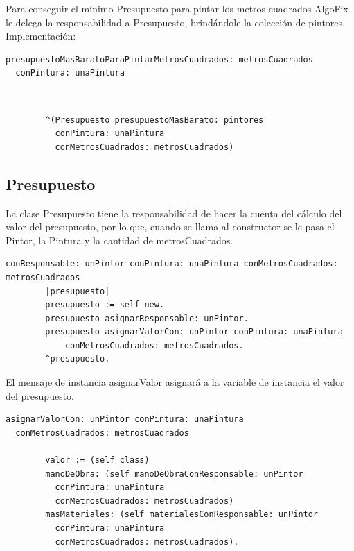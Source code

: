 \documentclass[titlepage,a4paper]{article}
\begin{document}
Para conseguir el mínimo Presupuesto para pintar los metros cuadrados AlgoFix le delega la responsabilidad a Presupuesto, brindándole la colección de pintores.\\
Implementación:
\begin{verbatim}
presupuestoMasBaratoParaPintarMetrosCuadrados: metrosCuadrados
  conPintura: unaPintura\end{verbatim}\\  \begin{verbatim}
        ^(Presupuesto presupuestoMasBarato: pintores
          conPintura: unaPintura
          conMetrosCuadrados: metrosCuadrados)

\end{verbatim}

\subsection{Presupuesto}
La clase Presupuesto tiene la responsabilidad de hacer la cuenta del cálculo del valor del presupuesto, por lo que, cuando se llama al constructor se le pasa el Pintor, la Pintura y la cantidad de metrosCuadrados.
\begin{verbatim}
conResponsable: unPintor conPintura: unaPintura conMetrosCuadrados:
metrosCuadrados
    	|presupuesto|
    	presupuesto := self new.
    	presupuesto asignarResponsable: unPintor.
    	presupuesto asignarValorCon: unPintor conPintura: unaPintura
    	    conMetrosCuadrados: metrosCuadrados.
    	^presupuesto.
\end{verbatim}
El mensaje de instancia asignarValor asignará a la variable de instancia el valor del presupuesto.
\begin{verbatim}
asignarValorCon: unPintor conPintura: unaPintura
  conMetrosCuadrados: metrosCuadrados

        valor := (self class)
        manoDeObra: (self manoDeObraConResponsable: unPintor 
          conPintura: unaPintura
          conMetrosCuadrados: metrosCuadrados) 
        masMateriales: (self materialesConResponsable: unPintor
          conPintura: unaPintura
          conMetrosCuadrados: metrosCuadrados).
\end{verbatim}
\end{document}
